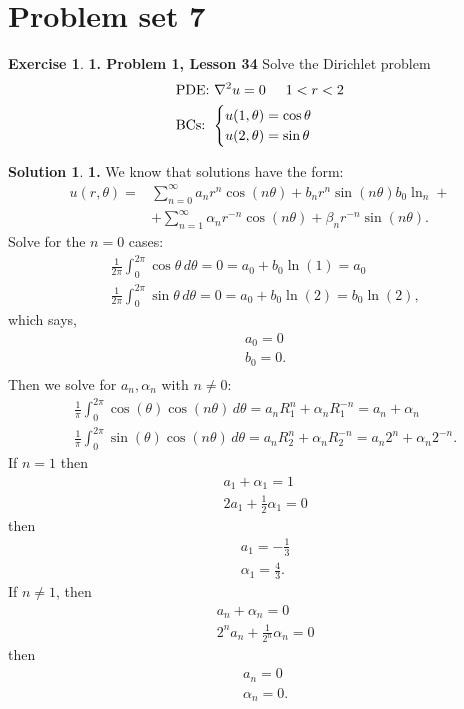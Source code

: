 \documentclass{book}
\theoremstyle{definition}
\newtheorem*{exer*}{Exercise}
\newtheorem*{sln*}{Solution}
\newcommand{\f}[2]{\frac{#1}{#2}}
\begin{document}
\newpage
\section{Problem set 7}



\begin{exer*}\textbf{1. Problem 1, Lesson 34} 
	Solve the Dirichlet problem
	\begin{align*}
	&\text{PDE: } \laplacian u = 0 \hspace{0.5cm} 1 < r < 2\\
	&\text{BCs: }
	\begin{cases}
	 u(1,\theta) = \cos\theta\\
	 u(2,\theta) = \sin\theta
	\end{cases}
	\end{align*}
	
	\begin{sln*}\textbf{1.} 
		We know that solutions have the form:
		\begin{align*}
		u(r,\theta) =& \sum^\infty_{n=0} a_n r^n \cos(n\theta) + b_n r^{n}\sin(n\theta) b_0\ln_n +\\
		&+\sum^\infty_{n=1}\alpha_n r^{-n}\cos(n\theta) + \beta_n r^{-n}\sin(n\theta). 
		\end{align*}
		Solve for the $n=0$ cases:
		\begin{align*}
		&\f{1}{2\pi}\int^{2\pi}_0 \cos\theta\,d\theta = 0 = a_0 + b_0 \ln(1) = a_0\\
		&\f{1}{2\pi}\int^{2\pi}_0 \sin\theta\,d\theta = 0 = a_0 + b_0 \ln(2) = b_0 \ln(2),
		\end{align*}
		which says,
		\begin{align*}
		&a_0 = 0\\
		&b_0 = 0.\\
		\end{align*}
		Then we solve for $a_n, \alpha_n$ with $n\neq 0$:
		\begin{align*}
		&\f{1}{\pi}\int^{2\pi}_0 \cos(\theta)\cos(n\theta)\,d\theta = a_n R_1^n + \alpha_n R_1^{-n} = a_n + \alpha_n\\
		&\f{1}{\pi}\int^{2\pi}_0 \sin(\theta)\cos(n\theta)\,d\theta = a_n R_2^n + \alpha_n R_2^{-n} = a_n 2^n + \alpha_n 2^{-n}.
		\end{align*}
		If $n=1$ then
		\begin{align*}
		& a_1 + \alpha_1 = 1\\
		& 2a_1 + \frac{1}{2}\alpha_1 = 0
		\end{align*}
		then 
		\begin{align*}
		&a_1 = -\frac{1}{3}\\
		&\alpha_1 = \frac{4}{3}.
		\end{align*}
		If $n\neq 1$, then 
		\begin{align*}
		& a_n + \alpha_n = 0\\
		& 2^n a_n + \frac{1}{2^n}\alpha_n = 0
		\end{align*}
		then 
		\begin{align*}
		&a_n = 0\\
		&\alpha_n = 0.
		\end{align*}
		

\end{sln*}
\end{exer*}
\end{document}
